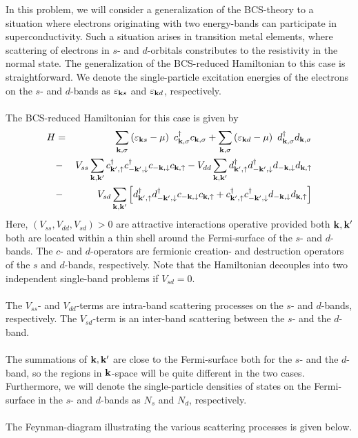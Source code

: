\begin{problem}
	In this problem, we will consider a generalization of the BCS-theory to a situation where electrons originating with two energy-bands can participate in superconductivity. Such a situation arises in transition metal elements, where scattering of electrons in $s$- and $d$-orbitals constributes to the resistivity in the normal state. The generalization of the BCS-reduced Hamiltonian to this case is  straightforward. We denote the single-particle excitation energies of the electrons on the $s$- and $d$-bands as $\varepsilon_{{\bf k} s}$ and $\varepsilon_{{\bf k} d}$, respectively.
	\ \\
	\ \\
	The BCS-reduced Hamiltonian for this case is given by
	\begin{eqnarray}
		H&  = &  \sum_{{\bf k},\sigma} \left( \varepsilon_{{\bf k} s} - \mu \right) ~ c^{\dagger}_{{\bf k},\sigma} c_{{\bf k},\sigma}
		+  \sum_{{\bf k},\sigma} \left( \varepsilon_{{\bf k} d} - \mu \right)  ~ d^{\dagger}_{{\bf k},\sigma} d_{{\bf k},\sigma} \nonumber \\
		& - & V_{ss} \sum_{{\bf k},{\bf k}^{\prime}} c^{\dagger}_{{\bf k}^{\prime},\uparrow}c^{\dagger}_{-{\bf k}^{\prime},\downarrow}
		c_{-{\bf k},\downarrow}c_{{\bf k},\uparrow}
		- V_{dd} \sum_{{\bf k},{\bf k}^{\prime}} d^{\dagger}_{{\bf k}^{\prime},\uparrow}d^{\dagger}_{-{\bf k}^{\prime},\downarrow}
		d_{-{\bf k},\downarrow} d_{{\bf k},\uparrow} \nonumber \\
		& - & V_{sd} \sum_{{\bf k},{\bf k}^{\prime}} \left[  d^{\dagger}_{{\bf k}^{\prime},\uparrow}d^{\dagger}_{-{\bf k}^{\prime},\downarrow}
		c_{-{\bf k},\downarrow} c_{{\bf k},\uparrow} 
		+c^{\dagger}_{{\bf k}^{\prime},\uparrow}c^{\dagger}_{-{\bf k}^{\prime},\downarrow}
		d_{-{\bf k},\downarrow} d_{{\bf k},\uparrow} \nonumber
		\right]
	\end{eqnarray}
	Here, $(V_{ss}, V_{dd}, V_{sd})>0$ are attractive interactions operative provided both ${\bf k},{\bf k}^{\prime}$ both are located within a thin shell around the Fermi-surface of the $s$- and $d$-bands. The $c$- and  $d$-operators are fermionic creation- and destruction operators of the $s$ and $d$-bands,  respectively. Note that the Hamiltonian decouples into two independent single-band problems if $V_{sd}=0$.
	\ \\
	\ \\
	The $V_{ss}$- and $V_{dd}$-terms are intra-band scattering processes on the $s$- and $d$-bands, respectively. The $V_{sd}$-term is an inter-band scattering between the $s$- and the $d$-band. 
	\ \\
	\ \\
	The summations of ${\bf k},{\bf k}^{\prime}$
	are close to the Fermi-surface both for the $s$- and the $d$-band, so the regions in ${\bf k}$-space will be quite different in the two cases. Furthermore, we will denote the single-particle densities of states on the Fermi-surface in the $s$- and $d$-bands as $N_s$ and $N_d$, respectively. 
	\ \\
	\ \\
	The Feynman-diagram illustrating the various scattering processes is given below. 
	\vskip 1.0cm
	

\end{problem}
